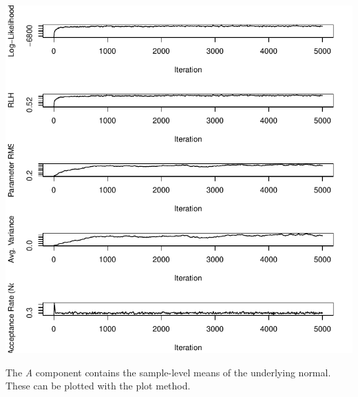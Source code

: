 \documentclass{article}\usepackage[]{graphicx}\usepackage[]{color}
\makeatletter
\def\maxwidth{ %
  \ifdim\Gin@nat@width>\linewidth
    \linewidth
  \else
    \Gin@nat@width
  \fi
}
\newenvironment{knitrout}{}{} %
\makeatother
\begin{document}
\begin{knitrout}
\includegraphics[width=\maxwidth]{figure/unnamed-chunk-11-1} 

\end{knitrout}

The \emph{A} component contains the sample-level means of the underlying normal. These can be plotted with the plot method.
\end{document}
